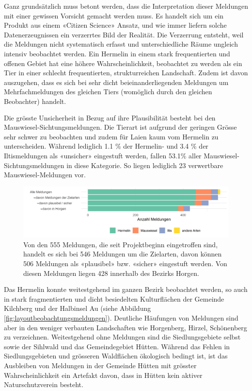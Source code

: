 \documentclass[
]{scrbook}
\begin{document}
Ganz grundsätzlich muss betont werden, dass die Interpretation dieser Meldungen mit einer gewissen Vorsicht gemacht werden muss. Es handelt sich um ein Produkt aus einem «Citizen Science» Ansatz, und wie immer liefern solche Datenerzeugnissen ein verzerrtes Bild der Realität. Die Verzerrung entsteht, weil die Meldungen nicht systematisch erfasst und unterschiedliche Räume ungleich intensiv beobachtet werden. Ein Hermelin in einem stark frequentierten und offenen Gebiet hat eine höhere Wahrscheinlichkeit, beobachtet zu werden als ein Tier in einer schlecht frequentierten, strukturreichen Landschaft. Zudem ist davon auszugehen, dass es sich bei sehr dicht beieinanderliegenden Meldungen um Mehrfachmeldungen des gleichen Tiers (womöglich durch den gleichen Beobachter) handelt.

Die grösste Unsicherheit in Bezug auf ihre Plausibilität besteht bei den Mauswiesel-Sichtungsmeldungen. Die Tierart ist aufgrund der geringen Grösse sehr schwer zu beobachten und zudem für Laien kaum vom Hermelin zu unterscheiden. Während lediglich 1.1 \% der Hermelin- und 3.4 \% der Iltismeldungen als «unsicher» eingestuft werden, fallen 53.1\% aller Mauswiesel-Sichtungsmeldungen in diese Kategorie. So liegen lediglich 23 verwertbare Mauswiesel-Meldungen vor.



\begin{figure}
\includegraphics[width=1\linewidth]{images/beobachtungsmeldungen_filter} \caption{Von den 555 Meldungen, die seit Projektbeginn eingetroffen sind, handelt es sich bei 546 Meldungen um die Zielarten, davon können 506 Meldungen als «plausibel» bzw. «sicher» eingestuft werden. Von diesen Meldungen liegen 428 innerhalb des Bezirks Horgen.}\label{fig:beobachtungsmeldungenfilter}
\end{figure}

Das Hermelin konnte weitestgehend im ganzen Bezirk beobachtet werden, so auch in stark fragmentierten und dicht besiedelten Kulturflächen der Gemeinde Kilchberg und der Halbinsel Au (siehe Abbildung \ref{fig:layoutbeobachtungsmeldungen}). Deutliche Häufungen von Meldungen sind aber in den weniger verbauten Landschaften wie Horgenberg, Hirzel, Schönenberg zu verzeichnen. Weitestgehend ohne Meldungen sind die Siedlungsgebiete selbst sowie der Sihlwald und das Gemeindegebiet Hütten. Während das Fehlen in Siedlungsgebieten und grösseren Waldflächen ökologisch bedingt ist, ist das Ausbleiben von Meldungen in der Gemeinde Hütten mit grösster Wahrscheinlichkeit ein Artefakt davon, dass in Hütten kein aktiver Naturschutzverein besteht.
\end{document}
